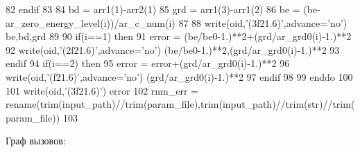 \begin{DoxyCode}
82 \textcolor{comment}{}\textcolor{keywordflow}{        endif}
83 
84         bd = arr1(1)-arr2(1)
85         grd = arr1(3)-arr1(2)
86         be = (be-ar\_zero\_energy\_level(i))/ar\_c\_num(i)
87 
88         \textcolor{keyword}{write}(oid,\textcolor{stringliteral}{'(3f21.6)'},advance=\textcolor{stringliteral}{'no'}) be,bd,grd
89 
90         \textcolor{keywordflow}{if}(i==1) \textcolor{keywordflow}{then}
91             error = (be/be0-1.)**2+(grd/ar\_grd0(i)-1.)**2
92             \textcolor{keyword}{write}(oid,\textcolor{stringliteral}{'(2f21.6)'},advance=\textcolor{stringliteral}{'no'}) (be/be0-1.)**2,(grd/ar\_grd0(i)-1.)\textcolor{comment}{**2}
93 \textcolor{comment}{}\textcolor{keywordflow}{        endif}
94         \textcolor{keywordflow}{if}(i==2) \textcolor{keywordflow}{then}
95             error = error+(grd/ar\_grd0(i)-1.)**2
96             \textcolor{keyword}{write}(oid,\textcolor{stringliteral}{'(f21.6)'},advance=\textcolor{stringliteral}{'no'}) (grd/ar\_grd0(i)-1.)**2
97 \textcolor{keywordflow}{        endif}
98 
99 \textcolor{keywordflow}{    enddo}
100 
101     \textcolor{keyword}{write}(oid,\textcolor{stringliteral}{'(3f21.6)'}) error
102     rnm\_err = rename(trim(input\_path)//trim(param\_file),trim(input\_path)//trim\textcolor{comment}{(str)//trim(param\_file))}
103 \textcolor{comment}{}
\end{DoxyCode}
Граф вызовов\+:\nopagebreak
